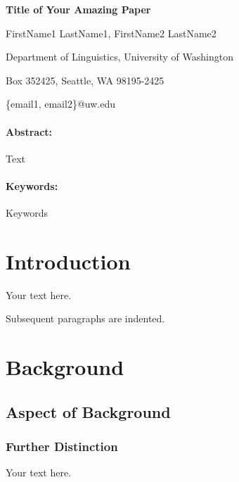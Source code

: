 \documentclass[12pt]{article}
\begin{document}
\begin{center}
    {\fontsize{14}{16}\selectfont \bf Title of Your Amazing Paper}
    
    \vspace{1em}

    FirstName1 LastName1, FirstName2 LastName2 

    \vspace{1em}

    Department of Linguistics, University of Washington

    Box 352425, Seattle, WA 98195-2425

    \{email1, email2\}@uw.edu
\end{center}

\paragraph{Abstract:} Text

\paragraph{Keywords:} Keywords


\section{Introduction}

Your text here.

Subsequent paragraphs are indented.


\section{Background}

\subsection{Aspect of Background}

\subsubsection{Further Distinction}

Your text here.


\printbibliography
\end{document}
